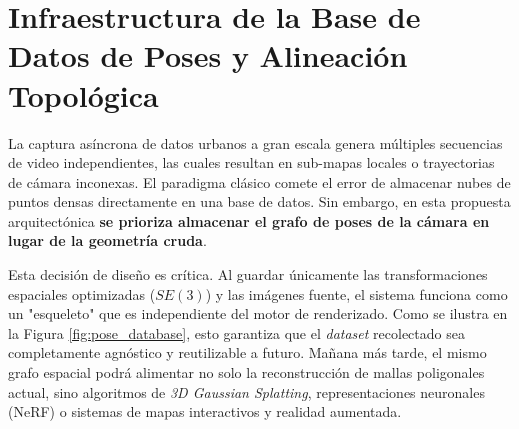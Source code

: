 \section{Infraestructura de la Base de Datos de Poses y Alineación Topológica}
La captura asíncrona de datos urbanos a gran escala genera múltiples secuencias de video independientes, las cuales resultan en sub-mapas locales o trayectorias de cámara inconexas. El paradigma clásico comete el error de almacenar nubes de puntos densas directamente en una base de datos. Sin embargo, en esta propuesta arquitectónica \textbf{se prioriza almacenar el grafo de poses de la cámara en lugar de la geometría cruda}.

Esta decisión de diseño es crítica. Al guardar únicamente las transformaciones espaciales optimizadas ($SE(3)$) y las imágenes fuente, el sistema funciona como un "esqueleto" que es independiente del motor de renderizado. Como se ilustra en la Figura \ref{fig:pose_database}, esto garantiza que el \textit{dataset} recolectado sea completamente agnóstico y reutilizable a futuro. Mañana más tarde, el mismo grafo espacial podrá alimentar no solo la reconstrucción de mallas poligonales actual, sino algoritmos de \textit{3D Gaussian Splatting}, representaciones neuronales (NeRF) o sistemas de mapas interactivos y realidad aumentada.

